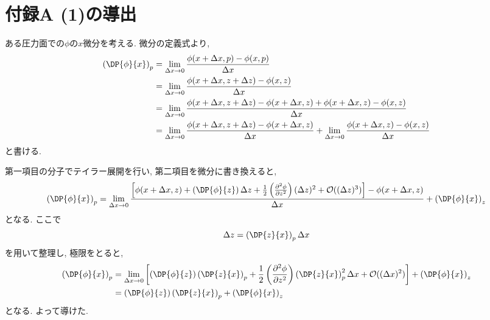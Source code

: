 \documentclass[a4j,12pt,openbib,oneside,dvipdfmx]{jarticle}
\def\theequation{\arabic{chapter}.\arabic{equation}}
\begin{document}
\section*{付録A (1)の導出}
\def\theequation{A.\arabic{equation}}
\setcounter{equation}{0}
\par
ある圧力面での$\phi$の$x$微分を考える. 微分の定義式より,
\begin{align}
  \left(\DP{\phi}{x}\right)_p&=\lim_{\Delta{x} \to 0} \frac{\phi(x+\Delta{x},p)-\phi(x,p)}{\Delta{x}} \nonumber \\
  &=\lim_{\Delta{x} \to 0} \frac{\phi(x+\Delta{x},z+\Delta{z})-\phi(x,z)}{\Delta{x}} \nonumber \\
  &=\lim_{\Delta{x} \to 0} \frac{\phi(x+\Delta{x},z+\Delta{z})-\phi(x+\Delta{x},z)+\phi(x+\Delta{x},z)-\phi(x,z)}{\Delta{x}} \nonumber \\
  &=\lim_{\Delta{x} \to 0} \frac{\phi(x+\Delta{x},z+\Delta{z})-\phi(x+\Delta{x},z)}{\Delta{x}} + \lim_{\Delta{x} \to 0} \frac{\phi(x+\Delta{x},z)-\phi(x,z)}{\Delta{x}} \nonumber 
\end{align}
と書ける. \\
\par
第一項目の分子でテイラー展開を行い, 第二項目を微分に書き換えると, 
\begin{equation}
  \left(\DP{\phi}{x}\right)_p=\lim_{\Delta{x} \to 0} \frac{\left[\phi(x+\Delta{x},z)+\left(\DP{\phi}{z}\right)\Delta{z}+\frac{1}{2}\left(\frac{\partial^2 \phi}{\partial z^2} \right)(\Delta{z})^2+\mathcal{O}((\Delta{z})^3) \right]-\phi(x+\Delta{x},z)}{\Delta{x}}+\left(\DP{\phi}{x}\right)_z \nonumber
\end{equation}
となる. ここで
\begin{equation}
  \Delta{z}=\left(\DP{z}{x}\right)_p\Delta{x} \nonumber
\end{equation}
を用いて整理し, 極限をとると, 
\begin{align}
  \left(\DP{\phi}{x}\right)_p&=\lim_{\Delta{x} \to 0} \left[\left(\DP{\phi}{z}\right)\left(\DP{z}{x}\right)_p+\frac{1}{2}\left(\frac{\partial^2 \phi}{\partial z^2} \right)\left(\DP{z}{x}\right)_p^2\Delta{x}+\mathcal{O}((\Delta{x})^2) \right]+\left(\DP{\phi}{x}\right)_z \nonumber \\
  &=\left(\DP{\phi}{z}\right)\left(\DP{z}{x}\right)_p+\left(\DP{\phi}{x}\right)_z  \nonumber
\end{align}
となる. よって導けた.
\end{document}

